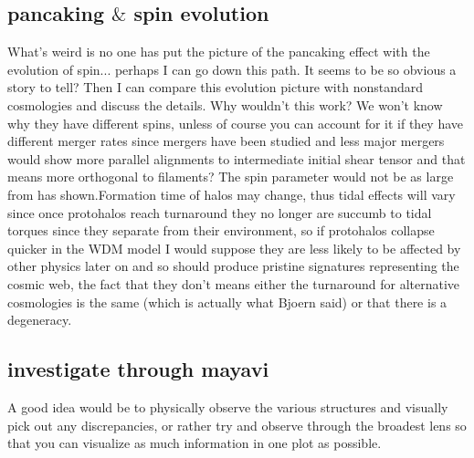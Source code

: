 \documentclass[fleqn,usenatbib]{mnras}
\begin{document}
\subsection{pancaking $\&$ spin evolution}
What's weird is no one has put the picture of the pancaking effect with the evolution of spin... perhaps I can go down this path. It seems to be so obvious a story to tell? Then I can compare this evolution picture with nonstandard cosmologies and discuss the details.
Why wouldn't this work? We won't know why they have different spins, unless of course you can account for it if they have different merger rates since mergers have been studied and less major mergers would show more parallel alignments to intermediate initial shear tensor and that means more orthogonal to filaments? The spin parameter would not be as large from \citet{Gardner_01} has shown.Formation time of halos may change, thus tidal effects will vary since once protohalos reach turnaround they no longer are succumb to tidal torques since they separate from their environment, so if protohalos collapse quicker in the WDM model I would suppose they are less likely to be affected by other physics later on and so should produce pristine signatures representing the cosmic web, the fact that they don't means either the turnaround for alternative cosmologies is the same (which is actually what Bjoern said) or that there is a degeneracy. 

\subsection{investigate through mayavi}
A good idea would be to physically observe the various structures and visually pick out any discrepancies, or rather try and observe through the broadest lens so that you can visualize as much information in one plot as possible.

 



\bsp	%
\label{lastpage}
\end{document}
